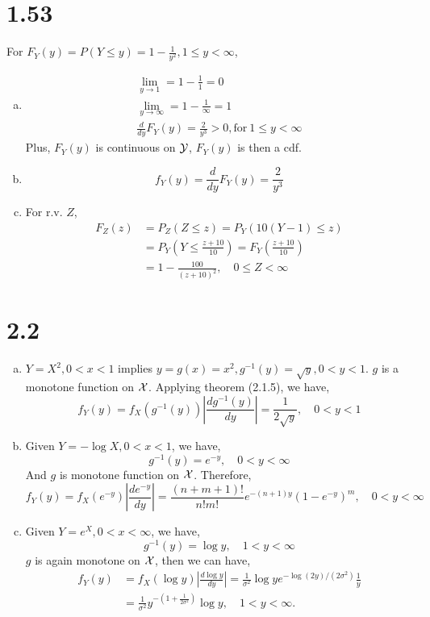 \documentclass[letterpaper]{article}
\newcommand{\cX}{\cal{X}}
\newcommand{\cY}{\cal{Y}}
\begin{document}
    \section*{1.53}
    For $F_Y(y) = P(Y \leq y) = 1-\frac{1}{y^2}, 1 \leq y < \infty$,
    \begin{enumerate}[(a)]
    \item
    \begin{eqnarray*}
    \lim_{y \to 1} = 1 - \frac{1}{1} = 0 \\
    \lim_{y \to \infty} = 1 - \frac{1}{\infty} = 1 \\
    \frac{d}{dy} F_Y(y) = \frac{2}{y^3} > 0, \text{for}~1 \leq y < \infty
    \end{eqnarray*}
    Plus, $F_Y(y)$ is continuous on $\cY$, $F_Y(y)$ is then a cdf.
    \item 
    \[
    f_Y(y) = \frac{d}{dy} F_Y(y) = \frac{2}{y^3}
    \]
    \item For r.v. $Z$,
    \begin{align*}
    F_Z(z) & = P_Z(Z \leq z) = P_Y\left(10(Y-1) \leq z\right) \\
    & = P_Y \left(Y \leq \frac{z + 10}{10}\right) = F_Y(\frac{z+10}{10}) \\
    & = 1 - \frac{100}{(z+10)^2}, \quad 0 \leq Z < \infty
    \end{align*}
    \end{enumerate}

    \section*{2.2}
    \begin{enumerate}[(a)]
    \item $Y = X^2, 0 < x < 1$ implies 
    $y=g(x) = x^2, g^{-1}(y) = \sqrt{y}, 0 < y < 1$. $g$ is a monotone function
    on $\cX$. Applying theorem (2.1.5), we have,
    \[
    f_Y(y) = f_X(g^{-1}(y)) \left| \frac{d g^{-1}(y)}{dy} \right| 
    = \frac{1}{2\sqrt{y}}, \quad 0 < y < 1
    \]
    \item Given $Y = -\log X, 0 < x < 1$, we have,
    \[ g^{-1}(y) = e^{-y}, \quad 0 < y < \infty \]
    And $g$ is monotone function on $\cX$.
    Therefore, 
    \[
    f_Y(y) = f_X(e^{-y}) \left| \frac{d e^{-y}}{dy} \right |
    = \frac{(n+m+1)!}{n!m!} e^{-(n+1)y} (1-e^{-y})^m, \quad 0 < y < \infty
    \]
    
    \item Given $Y = e^X, 0 < x < \infty$, we have,
    \[ g^{-1}(y) = \log y, \quad 1 < y < \infty \]
    $g$ is again monotone on $\cX$, then we can have,
    \begin{align*}
    f_Y(y) & = f_X(\log y) \left| \frac{d \log y}{dy} \right |
    = \frac{1}{\sigma^2} \log y e^{-\log (2y)/(2\sigma^2)} \frac{1}{y} \\
    & = \frac{1}{\sigma^2} y^{-(1+\frac{1}{2 \sigma^2})} \log y, \quad 1 < y <
    \infty.
    \end{align*}
    \end{enumerate}
\end{document}
